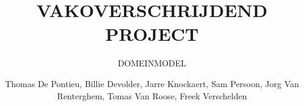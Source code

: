 \documentclass[a4paper, twoside, 12pt]{ugent_report}
\begin{document}
\title{VAKOVERSCHRIJDEND PROJECT}
\subtitle{DOMEINMODEL\\}
\author{Thomas De Pontieu, Billie Devolder, Jarre Knockaert, Sam Persoon, Jorg Van Renterghem, Tomas Van Roose, Freek Verschelden}
\maketitle

\restoregeometry
\newpage\null\thispagestyle{empty}\newpage
\end{document}
